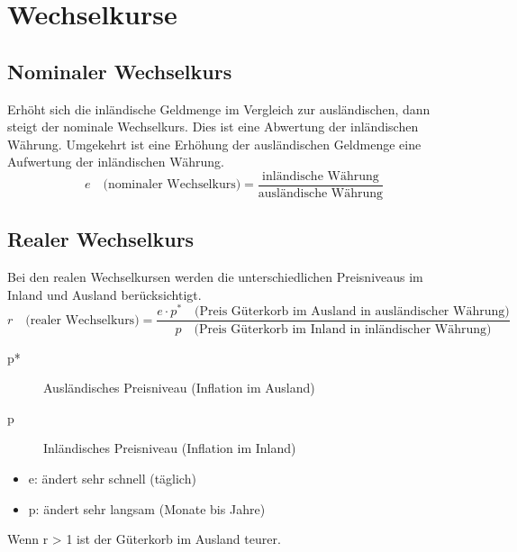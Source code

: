 \section{Wechselkurse}

\subsection{Nominaler Wechselkurs}
Erhöht sich die inländische Geldmenge im Vergleich zur ausländischen, dann steigt der nominale Wechselkurs. Dies ist eine Abwertung der inländischen Währung. Umgekehrt ist eine Erhöhung der ausländischen Geldmenge eine Aufwertung der inländischen Währung. 
\begin{equation*}
 e\quad\text{(nominaler Wechselkurs)} = \frac{\text{inländische  Währung}}{\text{ausländische Währung}}
\end{equation*}

\subsection{Realer Wechselkurs}
Bei den realen Wechselkursen werden die unterschiedlichen Preisniveaus im Inland und Ausland berücksichtigt.
\begin{equation*}
	r\quad \text{(realer Wechselkurs)} = \frac{e \cdot p^{*}\quad \text{(Preis Güterkorb  im Ausland in  ausländischer  Währung)}}{p\quad \text{(Preis\ Güterkorb im Inland in inländischer Währung})}
\end{equation*}
\begin{description}
	\item[p*] Ausländisches Preisniveau (Inflation im Ausland)
	\item[p] Inländisches Preisniveau (Inflation im Inland)
\end{description}
\begin{itemize}
	\item e: ändert sehr schnell (täglich)
	\item p: ändert sehr langsam (Monate bis Jahre)
\end{itemize}
Wenn r > 1 ist der Güterkorb im Ausland teurer.

